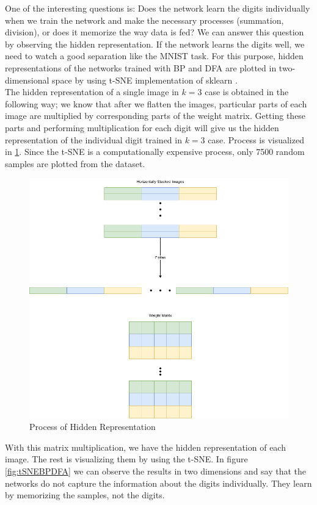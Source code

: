 \documentclass[a4paper, nobind]{templates/ociamthesis}
\begin{document}
One of the interesting questions is: Does the network learn the digits individually when we train the network and make the necessary processes (summation, division), or does it memorize the way data is fed? We can answer this question by observing the hidden representation. If the network learns the digits well, we need to watch a good separation like the MNIST task. For this purpose, hidden representations of the networks trained with BP and DFA are plotted in two-dimensional space by using t-SNE \cite{vanDerMaaten2008} implementation of sklearn \cite{scikit-learn}.\\
The hidden representation of a single image in \(k=3\) case is obtained in the following way; we know that after we flatten the images, particular parts of each image are multiplied by corresponding parts of the weight matrix. Getting these parts and performing multiplication for each digit will give us the hidden representation of the individual digit trained in \(k=3\) case. Process is visualized in \ref{fig:HiddenRepProcess}. Since the t-SNE is a computationally expensive process, only 7500 random samples are plotted from the dataset.

\begin{figure}

{\centering \includegraphics[width=0.6\linewidth]{figures/B_hidden_rep_process} 

}

\caption{Process of Hidden Representation}\label{fig:HiddenRepProcess}
\end{figure}

\noindent With this matrix multiplication, we have the hidden representation of each image. The rest is visualizing them by using the t-SNE. In figure \ref{fig:tSNEBPDFA} we can observe the results in two dimensions and say that the networks do not capture the information about the digits individually. They learn by memorizing the samples, not the digits.
\end{document}
